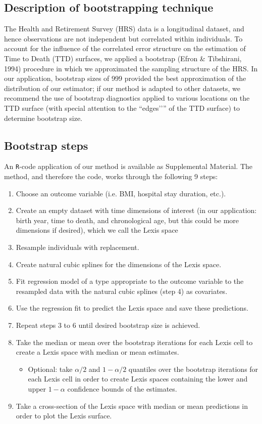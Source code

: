 \documentclass[11pt,oneside,a4paper]{article} %
\begin{document}
\begin{appendices}
\section{Description of bootstrapping technique}
The Health and Retirement Survey (HRS) data is a longitudinal dataset, and hence observations are not independent but correlated within individuals. To account for the influence of the correlated error structure on the estimation of Time to Death (TTD) surfaces, we applied a bootstrap (Efron & Tibshirani, 1994) procedure in which we approximated the sampling structure of the HRS. In our application, bootstrap sizes of 999 provided the best approximation of the distribution of our estimator; if our method is adapted to other datasets, we recommend the use of bootstrap diagnostics applied to various locations on the TTD surface (with special attention to the ``edges'’'' of the TTD surface) to determine bootstrap size.

\subsection{Bootstrap steps}
An \texttt{R}-code application of our method is available as Supplemental Material. The method, and therefore the code, works through the following 9 steps:
\begin{enumerate}
\item{Choose an outcome variable (i.e. BMI, hospital stay duration, etc.).}
\item{Create an empty dataset with time dimensions of interest (in our application: birth year, time to death, and chronological age, but this could be more dimensions if desired), which we call the Lexis space}
\item{Resample individuals with replacement.}
\item{Create natural cubic splines for the dimensions of the Lexis space.}
\item{Fit regression model of a type appropriate to the outcome variable to the resampled data with the natural cubic splines (step 4) as covariates.}
\item{Use the regression fit to predict the Lexis space and save these predictions.}
\item{Repeat steps 3 to 6 until desired bootstrap size is achieved.}
\item{Take the median or mean over the bootstrap iterations for each Lexis cell to create a Lexis space with median or mean estimates.\begin{itemize}\item{Optional: take $\alpha/2$ and  $1-\alpha/2$ quantiles over the bootstrap iterations for each Lexis cell in order to create Lexis spaces containing the lower and upper $1-\alpha$ confidence bounds of the estimates.}\end{itemize}}
\item{Take a cross-section of the Lexis space with median or mean predictions in order to plot the Lexis surface.}
\end{enumerate}


\end{appendices}
\end{document}
